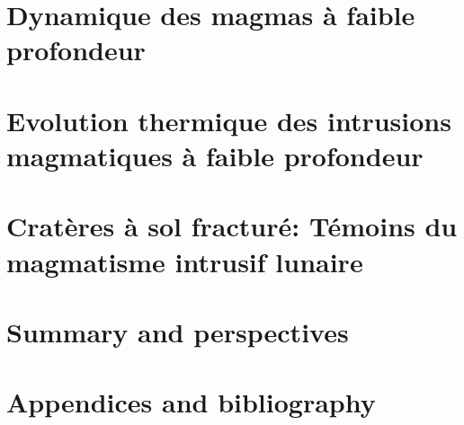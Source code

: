 \documentclass[a4paper,12pt,twoside]{ThesisStyle}
\begin{document}


\dominitoc
\setcounter{tocdepth}{2}


\cleardoublepage



\cleardoublepage

\tableofcontents

\mainmatter

\setcounter{chapter}{-1}
\pagestyle{empty}


\part{Dynamique des magmas à faible profondeur}

\pagestyle{fancy}




\part{Evolution   thermique  des   intrusions  magmatiques   à  faible
  profondeur}




\part{Cratères à sol fracturé: Témoins du magmatisme intrusif lunaire}





\part{Summary and perspectives}



\part{Appendices and bibliography}
\appendix






% 



\end{document}
